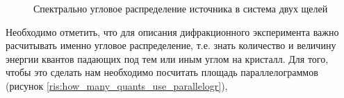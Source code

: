  \begin{figure}[H]
   \centering
   \hfill
   \caption{Спектрально угловое распределение источника в система двух щелей}
   \label{ris:sourc_map}
 \end{figure}

 Необходимо отметить, что для описания дифракционного эксперимента важно расчитывать именно
 угловое распределение, т.е. знать количество и величину энергии квантов падающих под тем
 или иным углом на кристалл. Для того, чтобы это сделать нам необходимо посчитать площадь параллелограммов
 (рисунок \ref{ris:how_many_quants_use_parallelogr}),

